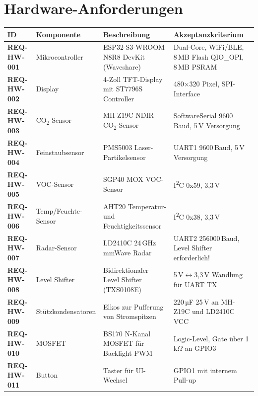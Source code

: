 \documentclass[a4paper,11pt]{article}
\begin{document}
\section{Hardware-Anforderungen}

\begin{longtable}{p{1.8cm} p{2.5cm} p{4cm} p{4.5cm}}
\toprule
\rowcolor{tableheader}
\textbf{ID} & \textbf{Komponente} & \textbf{Beschreibung} & \textbf{Akzeptanzkriterium} \\
\midrule
\endhead

\textbf{REQ-HW-001} & Mikrocontroller & ESP32-S3-WROOM N8R8 DevKit (Waveshare) & Dual-Core, WiFi/BLE, 8\,MB Flash QIO\_OPI, 8\,MB PSRAM \\
\midrule
\textbf{REQ-HW-002} & Display & 4-Zoll TFT-Display mit ST7796S Controller & 480$\times$320 Pixel, SPI-Interface \\
\midrule
\textbf{REQ-HW-003} & CO\textsubscript{2}-Sensor & MH-Z19C NDIR CO\textsubscript{2}-Sensor & SoftwareSerial 9600\,Baud, 5\,V Versorgung \\
\midrule
\textbf{REQ-HW-004} & Feinstaubsensor & PMS5003 Laser-Partikelsensor & UART1 9600\,Baud, 5\,V Versorgung \\
\midrule
\textbf{REQ-HW-005} & VOC-Sensor & SGP40 MOX VOC-Sensor & I\textsuperscript{2}C 0x59, 3,3\,V \\
\midrule
\textbf{REQ-HW-006} & Temp/Feuchte-Sensor & AHT20 Temperatur- und Feuchtigkeitssensor & I\textsuperscript{2}C 0x38, 3,3\,V \\
\midrule
\textbf{REQ-HW-007} & Radar-Sensor & LD2410C 24\,GHz mmWave Radar & UART2 256000\,Baud, Level Shifter erforderlich! \\
\midrule
\textbf{REQ-HW-008} & Level Shifter & Bidirektionaler Level Shifter (TXS0108E) & 5\,V$\leftrightarrow$3,3\,V Wandlung für UART TX \\
\midrule
\textbf{REQ-HW-009} & Stützkondensatoren & Elkos zur Pufferung von Stromspitzen & 220\,µF 25\,V an MH-Z19C und LD2410C VCC \\
\midrule
\textbf{REQ-HW-010} & MOSFET & BS170 N-Kanal MOSFET für Backlight-PWM & Logic-Level, Gate über 1\,k$\Omega$ an GPIO3 \\
\midrule
\textbf{REQ-HW-011} & Button & Taster für UI-Wechsel & GPIO1 mit internem Pull-up \\

\bottomrule
\end{longtable}
\end{document}
